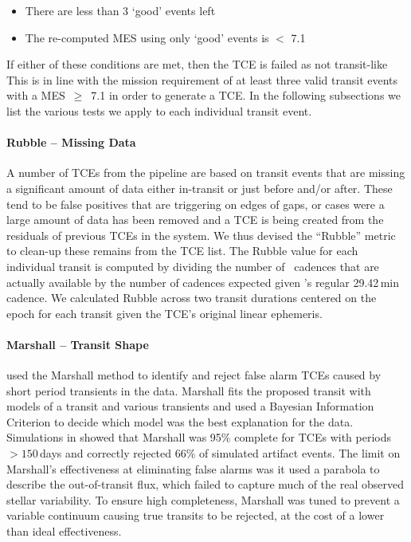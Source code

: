 \begin{itemize}
\item There are less than 3 `good' events left
\item The re-computed MES using only `good' events is $<$ 7.1
\end{itemize}

\noindent If either of these conditions are met, then the TCE is failed as not transit-like This is in line with the \kepler{} mission requirement of at least three valid transit events with a MES~$\ge$~7.1 in order to generate a TCE. In the following subsections we list the various tests we apply to each individual transit event.


\paragraph{Rubble -- Missing Data}

A number of TCEs from the \kepler{} pipeline are based on transit events that are missing a significant amount of data either in-transit or just before and/or after. These tend to be false positives that are triggering on edges of gaps, or cases were a large amount of data has been removed and a TCE is being created from the residuals of previous TCEs in the system. We thus devised the ``Rubble'' metric to clean-up these remains from the TCE list. The Rubble value for each individual transit is computed by dividing the number of \Kepler\ cadences that are actually available by the number of cadences expected given \Kepler's regular 29.42\,min cadence.  We calculated Rubble across two transit durations centered on the epoch for each transit given the TCE's original linear ephemeris. 


\paragraph{Marshall -- Transit Shape}
\label{marshsec}
\citet{Coughlin2016} used the Marshall method \citep{Mullally16} to identify and reject false alarm TCEs caused by short period transients in the data. Marshall fits the proposed transit with models of a transit and various transients and used a Bayesian Information Criterion to decide which model was the best explanation for the data. Simulations in \citet{Mullally16} showed that Marshall was 95\% complete for TCEs with periods $>150$\,days and correctly rejected 66\% of simulated artifact events. The limit on Marshall's effectiveness at eliminating false alarms was it used a parabola to describe the out-of-transit flux, which failed to capture much of the real observed stellar variability. To ensure high completeness, Marshall was tuned to prevent a variable continuum causing true transits to be rejected, at the cost of a lower than ideal effectiveness.

